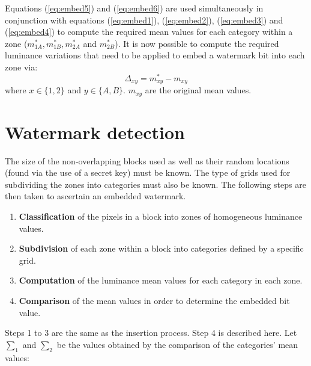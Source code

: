 \documentclass[12pt]{report}
\begin{document}
\begin{enumerate}
	Equations (\ref{eq:embed5}) and (\ref{eq:embed6}) are used simultaneously in conjunction with equations
	(\ref{eq:embed1}), (\ref{eq:embed2}), (\ref{eq:embed3}) and (\ref{eq:embed4}) to compute
	the required mean values for each category within a zone ($m_{1A}^{*}, m_{1B}^{*}, m_{2A}^{*}$
	and $m_{2B}^{*}$). It is now possible to compute the required luminance variations that need to be applied
	to embed a watermark bit into each zone via:
	\begin{equation}
		\Delta_{xy}=m_{xy}^{*}-m_{xy}
	\end{equation}
	where $x \in \{1,2\}$ and $y \in \{A,B\}$. $m_{xy}$ are the original mean values.


    \end{enumerate}

\section{Watermark detection}
	
	The size of the non-overlapping blocks used as well as their random locations (found via the
	use of a secret key) must be known. The type of grids used for subdividing the zones into 
	categories must also be known. The following steps are then taken to ascertain an embedded watermark.
	\begin{enumerate}	
		\item {\bf Classification} of the pixels in a block into zones of homogeneous luminance values.
		\item {\bf Subdivision} of each zone within a block into categories defined by a specific grid.
		\item {\bf Computation} of the luminance mean values for each category in each zone.
		\item {\bf Comparison} of the mean values in order to determine the embedded bit value.
	\end{enumerate}
	Steps 1 to 3 are the same as the insertion process. Step 4 is described here.
	Let $\sum_{1}$ and $\sum_{2}$ be the values obtained by the comparison of the categories' mean values:
\end{document}
